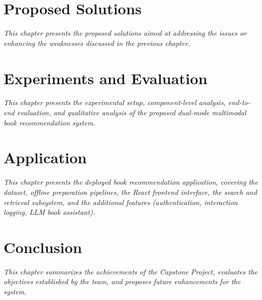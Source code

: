\documentclass[12pt]{report}
\begin{document}
\chapter{Proposed Solutions}
\textit{This chapter presents the proposed solutions aimed at addressing the issues or enhancing the weaknesses discussed in the previous chapter.}








\chapter{Experiments and Evaluation}

\textit{This chapter presents the experimental setup, component-level analysis, end-to-end evaluation, and qualitative analysis of the proposed dual-mode multimodal book recommendation system.}








\chapter{Application}

\textit{This chapter presents the deployed book recommendation application, covering the dataset, offline preparation pipelines, the React frontend interface, the search and retrieval subsystem, and the additional features (authentication, interaction logging, LLM book assistant).}










\chapter{Conclusion}
\textit{This chapter summarizes the achievements of the Capstone Project, evaluates the objectives established by the team, and proposes future enhancements for the system.}





\end{document}
